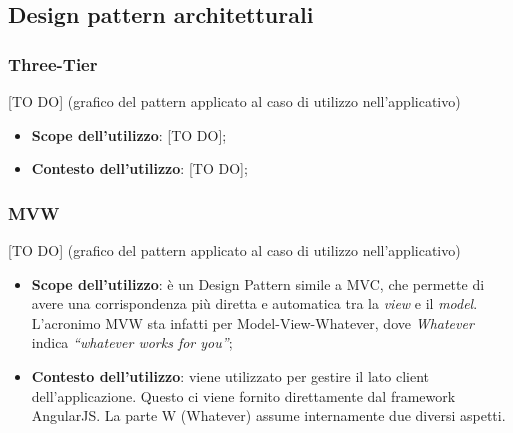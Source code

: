 %


\subsection{Design pattern architetturali} %
\label{sub:design_pattern_architetturali}
	\subsubsection{Three-Tier} %
	\label{ssub:three_tier}
	[TO DO] (grafico del pattern applicato al caso di utilizzo nell'applicativo)
		\begin{itemize}
			\item \textbf{Scope dell'utilizzo}: [TO DO];
			\item \textbf{Contesto dell'utilizzo}: [TO DO];
		\end{itemize}


	\subsubsection{MVW} %
	\label{ssub:mvw}
	[TO DO] (grafico del pattern applicato al caso di utilizzo nell'applicativo)

		\begin{itemize}
			\item \textbf{Scope dell'utilizzo}: è un Design Pattern simile a MVC, che permette di avere una corrispondenza più diretta e automatica tra la \emph{view} e il \emph{model}. L'acronimo MVW sta infatti per Model-View-Whatever, dove \emph{Whatever} indica \emph{``whatever works for you''};
			\item \textbf{Contesto dell'utilizzo}: viene utilizzato per gestire il lato client dell'applicazione. Questo ci viene fornito direttamente dal framework AngularJS. La parte W (Whatever) assume internamente due diversi aspetti.
		\end{itemize}

